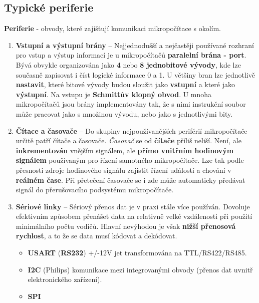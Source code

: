 \subsection{Typické periferie}
\textbf{Periferie} - obvody, které zajišťují komunikaci mikropočítace s okolím.

\begin{enumerate}
\item \textbf{Vstupní a výstupní brány} -- Nejjednodušší a nejčastěji používané rozhraní pro vstup a výstup informací je u mikropočítačů \textbf{paralelní brána - port}. Bývá obvykle organizována jako \textbf{4} nebo \textbf{8 jednobitové vývody}, kde lze současně zapisovat i číst logické informace 0 a 1. U většiny bran lze jednotlivě \textbf{nastavit}, které bitové vývody budou sloužit jako \textbf{vstupní} a které jako \textbf{výstupní}. Na vstupu je \textbf{Schmittův klopný obvod}. U mnoha mikropočítačů jsou brány implementovány tak, že s nimi instrukční soubor může pracovat jako s množinou vývodu, nebo jako s jednotlivými bity.

\item \textbf{Čítace a časovače} -- Do skupiny nejpoužívanějších periférií mikropočítače určitě patří čítače a časovače.
\emph{Časovač} se od \textbf{čítače} příliš neliší. Není, ale \textbf{inkrementován} vnějším signálem, ale \textbf{přímo vnitřním hodinovým signálem} používaným pro řízení samotného mikropočítače. Lze tak podle přesnosti zdroje hodinového signálu zajistit řízení událostí a chování v \textbf{reálném čase}. Při přetečení časovače se i zde může automaticky předávat signál do přerušovacího podsystému mikropočítače.

\item \textbf{Sériové linky} -- Sériový přenos dat je v praxi stále více používán. Dovoluje efektivním způsobem
přenášet data na relativně velké vzdálenosti při použití minimálního počtu vodičů. Hlavní nevýhodou je však \textbf{nižší přenosová rychlost}, a to že se data musí kódovat a dekódovat.
\begin{itemize}
\item \textbf{USART} (\textbf{RS232}) +/-12V jet transformována na TTL/RS422/RS485.
\item \textbf{I2C} (Philips) komunikace mezi integrovanými obvody (přenos dat uvnitř elektronického zařízení).
\item \textbf{SPI}
\end{itemize}


\end{enumerate}
